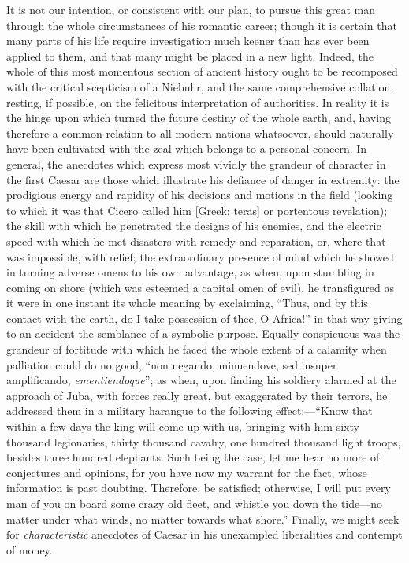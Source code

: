 It is not our intention, or consistent with our plan, to pursue this
great man through the whole circumstances of his romantic career; though
it is certain that many parts of his life require investigation much
keener than has ever been applied to them, and that many might be placed
in a new light. Indeed, the whole of this most momentous section of
ancient history ought to be recomposed with the critical scepticism of a
Niebuhr, and the same comprehensive collation, resting, if possible, on
the felicitous interpretation of authorities. In reality it is the hinge
upon which turned the future destiny of the whole earth, and, having
therefore a common relation to all modern nations whatsoever, should
naturally have been cultivated with the zeal which belongs to a personal
concern. In general, the anecdotes which express most vividly the
grandeur of character in the first Caesar are those which illustrate his
defiance of danger in extremity: the prodigious energy and rapidity of
his decisions and motions in the field (looking to which it was that
Cicero called him [Greek: teras] or portentous revelation); the skill
with which he penetrated the designs of his enemies, and the electric
speed with which he met disasters with remedy and reparation, or, where
that was impossible, with relief; the extraordinary presence of mind
which he showed in turning adverse omens to his own advantage, as when,
upon stumbling in coming on shore (which was esteemed a capital omen of
evil), he transfigured as it were in one instant its whole meaning by
exclaiming, ``Thus, and by this contact with the earth, do I take
possession of thee, O Africa!'' in that way giving to an accident the
semblance of a symbolic purpose. Equally conspicuous was the grandeur of
fortitude with which he faced the whole extent of a calamity when
palliation could do no good, ``non negando, minuendove, sed insuper
amplificando, \emph{ementiendoque}''; as when, upon finding his soldiery
alarmed at the approach of Juba, with forces really great, but
exaggerated by their terrors, he addressed them in a military harangue
to the following effect:—``Know that within a few days the king will
come up with us, bringing with him sixty thousand legionaries, thirty
thousand cavalry, one hundred thousand light troops, besides three
hundred elephants. Such being the case, let me hear no more of
conjectures and opinions, for you have now my warrant for the fact,
whose information is past doubting. Therefore, be satisfied; otherwise,
I will put every man of you on board some crazy old fleet, and whistle
you down the tide—no matter under what winds, no matter towards what
shore.'' Finally, we might seek for \emph{characteristic} anecdotes of Caesar
in his unexampled liberalities and contempt of money.

